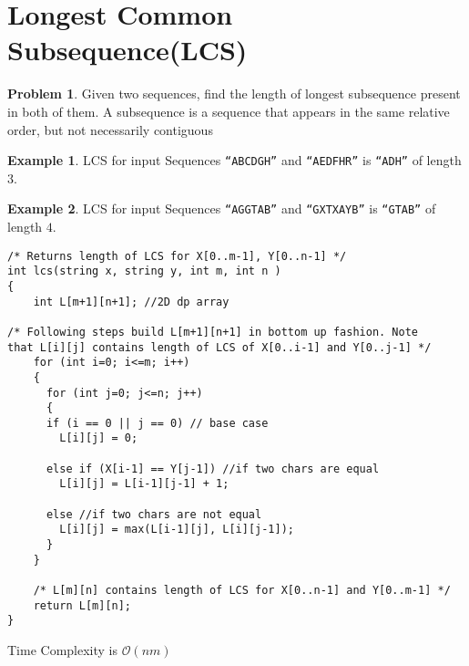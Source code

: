 \documentclass[twoside,12pt,a4paper,english]{book}
\theoremstyle{definition}
\newtheorem*{exmp}{Example}
\theoremstyle{problemstyle}
\newtheorem*{problem}{Problem} %
\theoremstyle{problemstyle}
\theoremstyle{problemstyle}
\begin{document}
\section{Longest Common Subsequence(LCS)}
\begin{problem}
Given two sequences, find the length of longest subsequence present in both of them. A subsequence is a sequence that appears in the same relative order, but not necessarily contiguous
\end{problem}
\begin{exmp}
LCS for input Sequences \texttt{“ABCDGH”} and \texttt{“AEDFHR”} is \texttt{“ADH”} of length $3$.
\end{exmp}
\begin{exmp}
LCS for input Sequences \texttt{“AGGTAB”} and \texttt{“GXTXAYB”} is \texttt{“GTAB”} of length $4$.
\end{exmp}
\begin{tcolorbox}[title=Solution]

\begin{lstlisting}
/* Returns length of LCS for X[0..m-1], Y[0..n-1] */
int lcs(string x, string y, int m, int n )
{
    int L[m+1][n+1]; //2D dp array

/* Following steps build L[m+1][n+1] in bottom up fashion. Note
that L[i][j] contains length of LCS of X[0..i-1] and Y[0..j-1] */
    for (int i=0; i<=m; i++)
    {
      for (int j=0; j<=n; j++)
      {
      if (i == 0 || j == 0) // base case
        L[i][j] = 0;

      else if (X[i-1] == Y[j-1]) //if two chars are equal
        L[i][j] = L[i-1][j-1] + 1;

      else //if two chars are not equal
        L[i][j] = max(L[i-1][j], L[i][j-1]);
      }
    }

    /* L[m][n] contains length of LCS for X[0..n-1] and Y[0..m-1] */
    return L[m][n];
}
\end{lstlisting}
Time Complexity is $\mathcal{O}(nm)$
\end{tcolorbox}
\newpage
\end{document}
